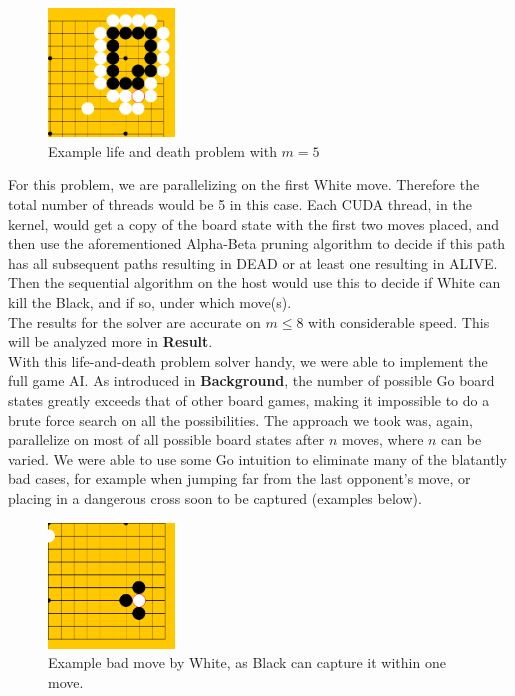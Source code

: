 \documentclass[11pt]{article}
\begin{document}
\begin{figure}[H]
    \centering
    \includegraphics[width=0.3\textwidth]{ld_pro_1.png}
    \caption{Example life and death problem with $m = 5$}
\end{figure}
For this problem, we are parallelizing on the first White move. Therefore the total number of threads would be 5 in this case. Each CUDA thread, in the kernel, would get a copy of the board state with the first two moves placed, and then use the aforementioned Alpha-Beta pruning algorithm to decide if this path has all subsequent paths resulting in DEAD or at least one resulting in ALIVE. Then the sequential algorithm on the host would use this to decide if White can kill the Black, and if so, under which move(s). \\
The results for the solver are accurate on $m \leq 8$ with considerable speed. This will be analyzed more in \textbf{Result}. \\
With this life-and-death problem solver handy, we were able to implement the full game AI. As introduced in \textbf{Background}, the number of possible Go board states greatly exceeds that of other board games, making it impossible to do a brute force search on all the possibilities. The approach we took was, again, parallelize on most of all possible board states after $n$ moves, where $n$ can be varied. We were able to use some Go intuition to eliminate many of the blatantly bad cases, for example when jumping far from the last opponent's move, or placing in a dangerous cross soon to be captured (examples below).
\begin{figure}[H]
    \centering
    \includegraphics[width=0.3\textwidth]{bad_1.png}
    \caption{Example bad move by White, as Black can capture it within one move.}
\end{figure}
\end{document}
